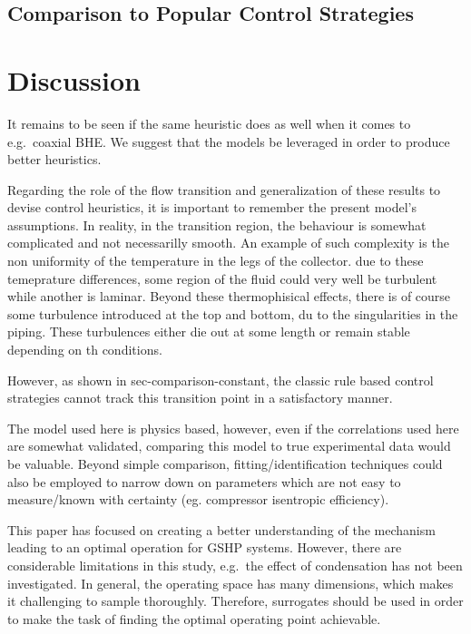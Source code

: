 \documentclass[journal=iecr,manuscript=]{achemso}
\begin{document}
\subsection{Comparison to Popular Control
Strategies}\label{comparison-to-popular-control-strategies}

\section{Discussion}\label{discussion}

It remains to be seen if the same heuristic does as well when it comes
to e.g.~coaxial BHE. We suggest that the models be leveraged in order to
produce better heuristics.

Regarding the role of the flow transition and generalization of these
results to devise control heuristics, it is important to remember the
present model's assumptions. In reality, in the transition region, the
behaviour is somewhat complicated and not necessarilly smooth. An
example of such complexity is the non uniformity of the temperature in
the legs of the collector. due to these temeprature differences, some
region of the fluid could very well be turbulent while another is
laminar. Beyond these thermophisical effects, there is of course some
turbulence introduced at the top and bottom, du to the singularities in
the piping. These turbulences either die out at some length or remain
stable depending on th conditions.

However, as shown in sec-comparison-constant, the classic rule based
control strategies cannot track this transition point in a satisfactory
manner.

The model used here is physics based, however, even if the correlations
used here are somewhat validated, comparing this model to true
experimental data would be valuable. Beyond simple comparison,
fitting/identification techniques could also be employed to narrow down
on parameters which are not easy to measure/known with certainty (eg.
compressor isentropic efficiency).

This paper has focused on creating a better understanding of the
mechanism leading to an optimal operation for GSHP systems. However,
there are considerable limitations in this study, e.g.~the effect of
condensation has not been investigated. In general, the operating space
has many dimensions, which makes it challenging to sample thoroughly.
Therefore, surrogates should be used in order to make the task of
finding the optimal operating point achievable.
\end{document}
